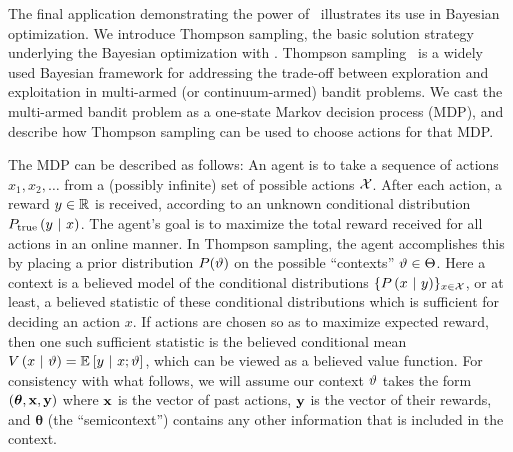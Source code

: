 The final application demonstrating the power of \gpmem\ illustrates its use in Bayesian optimization. We introduce Thompson sampling, the basic solution strategy
underlying the Bayesian optimization with \gpmem.
Thompson sampling~\cite{thompson1933likelihood} is a widely used Bayesian
framework for addressing the trade-off between exploration and exploitation in
multi-armed (or continuum-armed) bandit problems.  
We cast the multi-armed bandit problem as a one-state Markov
decision process (MDP), and describe how Thompson sampling can be used to choose
actions for that MDP.

The MDP can be described as follows: An agent is to take a sequence of actions $x_1, x_2,
\ldots$ from a (possibly infinite) set of possible actions $\mathcal{X}$.  After each
action, a reward $y \in \mathbb{R}$ is received, according to an unknown conditional
distribution $P_{\textrm{true}}\left( y \ \middle\vert\  x \right)$.  The agent's goal is to maximize the
total reward received for all actions in an online manner.  In Thompson
sampling, the agent accomplishes this by placing a prior distribution
$P(\vartheta)$ on the possible ``contexts'' $\vartheta \in \Theta$.  Here a context
is a believed model of the conditional distributions $\{P\left( x \ \middle\vert\  y \right)\}_{x
\in \mathcal{X}}$, or at least, a believed statistic of these conditional
distributions which is sufficient for deciding an action $x$.  If actions are
chosen so as to maximize expected reward, then one such sufficient statistic is
the believed conditional mean $V \left( x \ \middle\vert\  \vartheta \right) = \mathbb{E}_{}\left[ y \ \middle\vert\ 
x;\vartheta \right]$, which can be viewed as a believed value function.  For
consistency with what follows, we will assume our context $\vartheta$ takes the
form $(\bm{\theta}, \mathbf{x}, \mathbf{y})$ where $\mathbf{x}$ is the vector of past
actions, $\mathbf{y}$ is the vector of their rewards, and $\bm{\theta}$ (the
``semicontext'') contains any other information that is included in the context.

